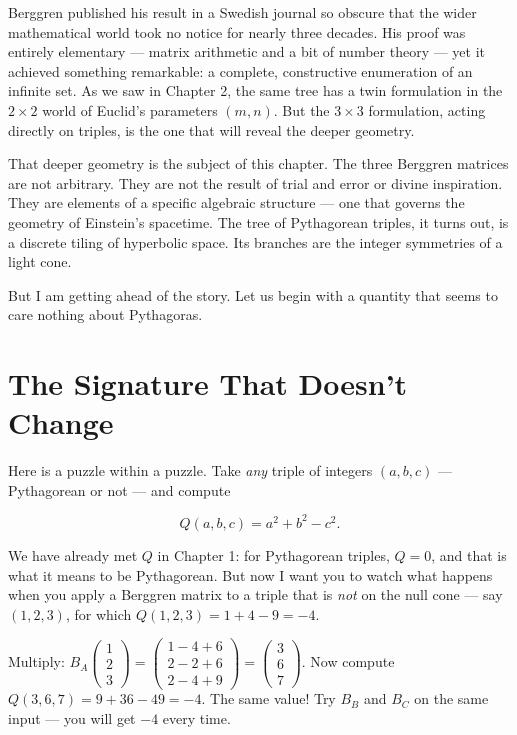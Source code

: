 Berggren published his result in a Swedish journal so obscure that the wider mathematical world took no notice for nearly three decades. His proof was entirely elementary --- matrix arithmetic and a bit of number theory --- yet it achieved something remarkable: a complete, constructive enumeration of an infinite set. As we saw in Chapter 2, the same tree has a twin formulation in the $2 \times 2$ world of Euclid's parameters $(m, n)$. But the $3 \times 3$ formulation, acting directly on triples, is the one that will reveal the deeper geometry.

That deeper geometry is the subject of this chapter. The three Berggren matrices are not arbitrary. They are not the result of trial and error or divine inspiration. They are elements of a specific algebraic structure --- one that governs the geometry of Einstein's spacetime. The tree of Pythagorean triples, it turns out, is a discrete tiling of hyperbolic space. Its branches are the integer symmetries of a light cone.

But I am getting ahead of the story. Let us begin with a quantity that seems to care nothing about Pythagoras.


\ornbreak



\section{The Signature That Doesn't Change}


Here is a puzzle within a puzzle. Take \textit{any} triple of integers $(a, b, c)$ --- Pythagorean or not --- and compute

\[
Q(a, b, c) = a^2 + b^2 - c^2.
\]

We have already met $Q$ in Chapter 1: for Pythagorean triples, $Q = 0$, and that is what it means to be Pythagorean. But now I want you to watch what happens when you apply a Berggren matrix to a triple that is \textit{not} on the null cone --- say $(1, 2, 3)$, for which $Q(1, 2, 3) = 1 + 4 - 9 = -4$.

Multiply: $B_A \begin{pmatrix} 1 \\ 2 \\ 3 \end{pmatrix} = \begin{pmatrix} 1 - 4 + 6 \\ 2 - 2 + 6 \\ 2 - 4 + 9 \end{pmatrix} = \begin{pmatrix} 3 \\ 6 \\ 7 \end{pmatrix}.$ Now compute $Q(3, 6, 7) = 9 + 36 - 49 = -4.$ The same value! Try $B_B$ and $B_C$ on the same input --- you will get $-4$ every time.

